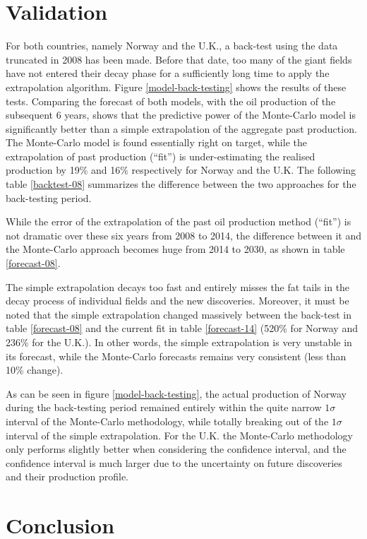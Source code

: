 \documentclass[review]{elsarticle}
\begin{document}
\section{Validation}

For both countries, namely Norway and the U.K., a back-test using
the data truncated in 2008 has been made. Before that date, too many
of the giant fields have not entered their decay phase for a sufficiently
long time to apply the extrapolation algorithm. Figure \ref{model-back-testing}
shows the results of these tests. Comparing the forecast of both models,
with the oil production of the subsequent 6 years, shows that the
predictive power of the Monte-Carlo model is significantly better than a simple
extrapolation of the aggregate past production. The Monte-Carlo model 
is found essentially right on target, while the extrapolation of past production
(``fit'') is under-estimating the realised production by 19\% and 16\% respectively
for Norway and the U.K. The following table \ref{backtest-08}
summarizes the difference between the two approaches for the back-testing
period.

While the error of the extrapolation of the past oil production method (``fit'') is not dramatic
over these six years from 2008 to 2014, the difference between it and the Monte-Carlo
approach becomes huge from 2014 to 2030, as shown in table \ref{forecast-08}.

The simple extrapolation decays too fast and entirely misses the fat
tails in the decay process of individual fields and the new discoveries.
Moreover, it must be noted that the simple extrapolation changed massively
between the back-test in table \ref{forecast-08} and the current
fit in table \ref{forecast-14} (520\% for Norway and 236\% for the
U.K.). In other words, the simple extrapolation is very unstable
in its forecast, while the Monte-Carlo forecasts remains very consistent
(less than 10\% change).

As can be seen in figure \ref{model-back-testing}, the actual production
of Norway during the back-testing period remained entirely within
the quite narrow $1\sigma$ interval of the Monte-Carlo methodology,
while totally breaking out of the $1\sigma$ interval of the simple
extrapolation. For the U.K. the Monte-Carlo methodology only performs
slightly better when considering the confidence interval, and the
confidence interval is much larger due to the uncertainty on future
discoveries and their production profile.


\section{Conclusion}
\end{document}
